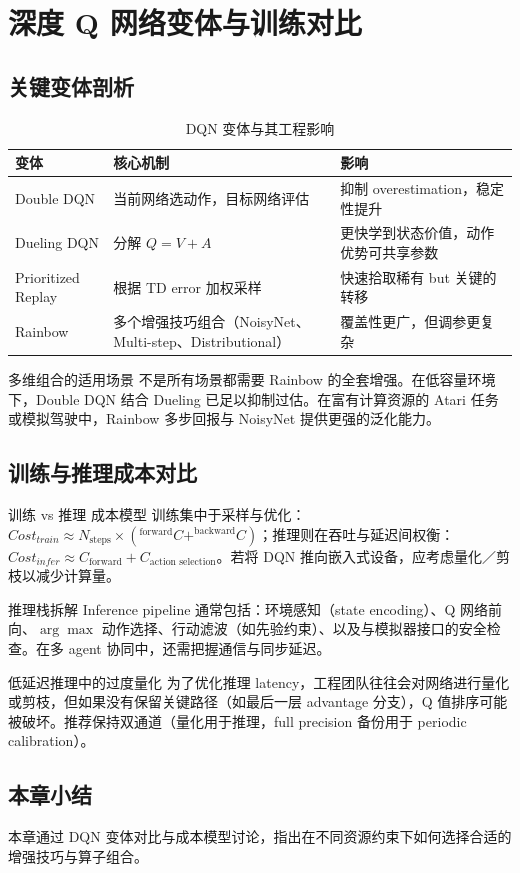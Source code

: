 \section{深度 Q 网络变体与训练对比}

\subsection{关键变体剖析}

\begin{table}[H]
\centering
\begin{tabular}{lll}
\toprule
变体 & 核心机制 & 影响 \\
\midrule
Double DQN & 当前网络选动作，目标网络评估 & 抑制 overestimation，稳定性提升 \\
Dueling DQN & 分解 $Q=V+A$ & 更快学到状态价值，动作优势可共享参数 \\
Prioritized Replay & 根据 TD error 加权采样 & 快速拾取稀有 but 关键的转移 \\
Rainbow & 多个增强技巧组合（NoisyNet、Multi-step、Distributional） & 覆盖性更广，但调参更复杂 \\
\bottomrule
\end{tabular}
\caption{DQN 变体与其工程影响}
\end{table}

\begin{knowledgebox}{多维组合的适用场景}
不是所有场景都需要 Rainbow 的全套增强。在低容量环境下，Double DQN 结合 Dueling 已足以抑制过估。在富有计算资源的 Atari 任务或模拟驾驶中，Rainbow 多步回报与 NoisyNet 提供更强的泛化能力。
\end{knowledgebox}

\subsection{训练与推理成本对比}

\begin{importantbox}{训练 vs 推理 成本模型}
训练集中于采样与优化：$Cost_{train} \approx N_{\text{steps}} \times (^{\text{forward}}C + ^{\text{backward}}C)$；推理则在吞吐与延迟间权衡：$Cost_{infer} \approx C_{\text{forward}} + C_{\text{action selection}}$。若将 DQN 推向嵌入式设备，应考虑量化／剪枝以减少计算量。
\end{importantbox}

\begin{knowledgebox}{推理栈拆解}
Inference pipeline 通常包括：环境感知（state encoding）、Q 网络前向、$\arg\max$ 动作选择、行动滤波（如先验约束）、以及与模拟器接口的安全检查。在多 agent 协同中，还需把握通信与同步延迟。
\end{knowledgebox}

\begin{warningbox}{低延迟推理中的过度量化}
为了优化推理 latency，工程团队往往会对网络进行量化或剪枝，但如果没有保留关键路径（如最后一层 advantage 分支），Q 值排序可能被破坏。推荐保持双通道（量化用于推理，full precision 备份用于 periodic calibration）。
\end{warningbox}

\subsection{本章小结}

本章通过 DQN 变体对比与成本模型讨论，指出在不同资源约束下如何选择合适的增强技巧与算子组合。

